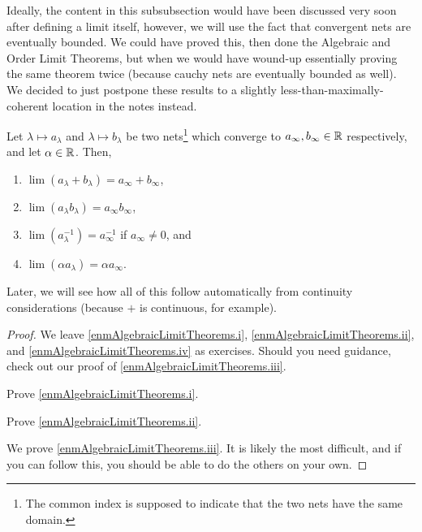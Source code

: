 Ideally, the content in this subsubsection would have been discussed very soon after defining a limit itself, however, we will use the fact that convergent nets are eventually bounded.  We could have proved this, then done the Algebraic and Order Limit Theorems, but when we would have wound-up essentially proving the same theorem twice (because cauchy nets are eventually bounded as well).  We decided to just postpone these results to a slightly less-than-maximally-coherent location in the notes instead.
\begin{prp}\label{AlgebraicLimitTheorems}
\begin{savenotes}
Let $\lambda \mapsto a_\lambda$ and $\lambda \mapsto b_\lambda$ be two nets\footnote{The common index is supposed to indicate that the two nets have the same domain.} which converge to $a_\infty,b_\infty\in \mathbb{R}$ respectively, and let $\alpha \in \mathbb{R}$.  Then,
\begin{enumerate}
\item \label{enmAlgebraicLimitTheorems.i}$\lim (a_\lambda +b_\lambda )=a_\infty+b_\infty$,
\item \label{enmAlgebraicLimitTheorems.ii}$\lim (a_\lambda b_\lambda )=a_\infty b_\infty$,
\item \label{enmAlgebraicLimitTheorems.iii}$\lim (a_\lambda ^{-1})=a_\infty ^{-1}$ if $a_\infty \neq 0$, and
\item \label{enmAlgebraicLimitTheorems.iv}$\lim (\alpha a_\lambda )=\alpha a_\infty$.
\end{enumerate}
\begin{rmk}
Later, we will see how all of this follow automatically from continuity considerations (because $+$ is continuous, for example).
\end{rmk}
\begin{proof}
We leave \ref{enmAlgebraicLimitTheorems.i}, \ref{enmAlgebraicLimitTheorems.ii}, and \ref{enmAlgebraicLimitTheorems.iv} as exercises.  Should you need guidance, check out our proof of \ref{enmAlgebraicLimitTheorems.iii}.
\begin{exr}
Prove \ref{enmAlgebraicLimitTheorems.i}.
\end{exr}
\begin{exr}
Prove \ref{enmAlgebraicLimitTheorems.ii}.
\end{exr}
We prove \ref{enmAlgebraicLimitTheorems.iii}.  It is likely the most difficult, and if you can follow this, you should be able to do the others on your own.


\end{proof}
\end{savenotes}
\end{prp}
